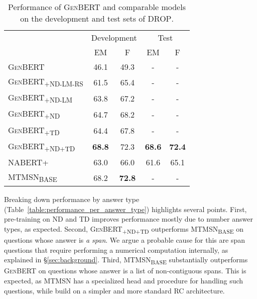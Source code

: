 \documentclass[11pt,a4paper]{article}
\newcommand\ssc[1]{\textsubscript{\textsc{#1}}}
\newcommand\genbert{\textsc{GenBERT}}
\newcommand\nabert{\textsc{NABERT+}}
\newcommand\mtmsn{\textsc{MTMSN}}
\newcommand\drop{\textsc{DROP}}
\begin{document}
\begin{table}[t]\setlength{\belowcaptionskip}{-5pt}
    \footnotesize
    \centering
    \begin{tabular}{l|c|c|c|c|}
         & \multicolumn{2}{c|}{Development} & \multicolumn{2}{c|}{Test} \\ 
         & EM & F & EM & F \\ \hline
         \textsc{GenBERT} & 46.1 & 49.3 & - & -\\
         \textsc{GenBERT\ssc{+ND-LM-RS}} & 61.5 & 65.4 & - & -\\
         \textsc{GenBERT\ssc{+ND-LM}} & 63.8 & 67.2 & -& -\\
         \textsc{GenBERT\ssc{+ND}} & 64.7 & 68.2 & -& -\\
         \textsc{GenBERT\ssc{+TD}} & 64.4 & 67.8 & -& -\\
         \textsc{GenBERT\ssc{+ND+TD}} & \textbf{68.8} & 72.3 & \textbf{68.6} & \textbf{72.4} \\
\hline\hline
         \nabert & 63.0 & 66.0 & 61.6 & 65.1 \\
         \mtmsn \textsubscript{\textsc{BASE}} & 68.2 & \textbf{72.8} & -& -\\
\end{tabular}
    \caption{Performance of \genbert{} and comparable models on the development and test sets of \drop{}.}
\label{table:drop_performance}
\end{table}

Breaking down performance by answer type (Table~\ref{table:performance_per_answer_type}) highlights several points. First, pre-training on ND and TD improves performance mostly due to number answer types, as expected.
Second, \textsc{GenBERT\ssc{+ND+TD}} outperforms \mtmsn \textsubscript{\textsc{BASE}} on questions whose answer is \emph{a span}. We argue a probable cause for this are span questions that require performing a numerical computation internally, as explained in \S\ref{sec:background}.
Third, \mtmsn \textsubscript{\textsc{BASE}} substantially outperforms \genbert{} on questions whose answer is a list of non-contiguous spans. This is expected, as \mtmsn{} has a specialized head and procedure for handling such questions, while build on a simpler and more standard RC architecture.
\end{document}
